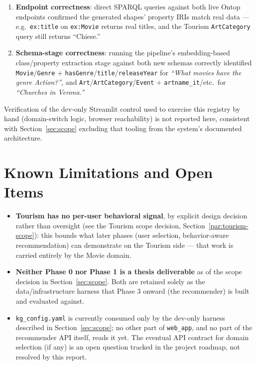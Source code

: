 \documentclass[11pt,a4paper]{article}
\newcommand{\code}[1]{\texttt{#1}}
\begin{document}
\begin{enumerate}
    \item \textbf{Endpoint correctness}: direct SPARQL queries against both live Ontop endpoints
        confirmed the generated shapes' property IRIs match real data --- e.g.\ \code{ex:title}
        on \code{ex:Movie} returns real titles, and the Tourism \code{ArtCategory} query still
        returns ``Chiese.''
    \item \textbf{Schema-stage correctness}: running the pipeline's embedding-based class/property
        extraction stage against both new schemas correctly identified \code{Movie}\slash\code{Genre}
        + \code{hasGenre}\slash\code{title}\slash\code{releaseYear} for \emph{``What movies have the genre
        Action?''}, and \code{Art}\slash\code{ArtCategory}\slash\code{Event} + \code{artname\_it}/etc.\ for
        \emph{``Churches in Verona.''}
\end{enumerate}

\noindent Verification of the dev-only Streamlit control used to exercise this registry by hand
(domain-switch logic, browser reachability) is not reported here, consistent with
Section~\ref{sec:scope} excluding that tooling from the system's documented architecture.

\newpage
\section{Known Limitations and Open Items}

\begin{itemize}
    \item \textbf{Tourism has no per-user behavioral signal}, by explicit design decision rather
        than oversight (see the Tourism scope decision, Section~\ref{par:tourism-scope}): this bounds what later
        phases (user selection, behavior-aware recommendation) can demonstrate on the Tourism
        side --- that work is carried entirely by the Movie domain.
    \item \textbf{Neither Phase 0 nor Phase 1 is a thesis deliverable} as of the scope decision in
        Section~\ref{sec:scope}. Both are retained solely as the data/infrastructure harness that
        Phase 3 onward (the recommender) is built and evaluated against.
    \item \code{kg\_config.yaml} is currently consumed only by the dev-only harness described in
        Section~\ref{sec:scope}; no other part of \code{web\_app}, and no part of the recommender
        API itself, reads it yet. The eventual API contract for domain selection (if any) is an
        open question tracked in the project roadmap, not resolved by this report.
\end{itemize}
\end{document}
